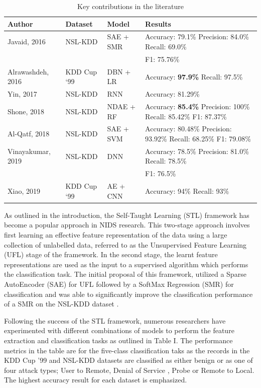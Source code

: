 \documentclass[conference]{IEEEtran}
\begin{document}
\begin{table}[htbp]
\caption{Key contributions in the literature}
\begin{center}
\begin{tabular}{|p{1.5cm}|p{1.8cm}|p{1.5cm}|p{2.1cm}|}
\hline
\textbf{Author} & \textbf{Dataset} & \textbf{Model} & \textbf{Results}\\[2pt]
\hline

Javaid, 2016 \cite{b2}  & NSL-KDD & SAE + SMR&
Accuracy: 79.1\% Precision: 84.0\% Recall: 69.0\%  \\
& & &F1: 75.76\%
\\[5pt]
\hline
Alrawashdeh, 2016 \cite{b6} & KDD Cup ‘99 & DBN + LR & Accuracy: \textbf{97.9\%} Recall: 97.5\%\\[10pt]
\hline
Yin, 2017 & NSL-KDD & RNN&
Accuracy: 81.29\% \\[5pt]
\hline
Shone, 2018 \cite{b10} & NSL-KDD & NDAE + RF & 
Accuracy: \textbf{85.4\%} Precision: 100\% Recall: 85.42\% F1: 87.37\%\\
\hline 
Al-Qatf, 2018 & NSL-KDD & SAE + SVM & 
Accuracy: 80.48\% Precision: 93.92\% Recall: 68.25\% F1: 79.08\%\\
\hline
Vinayakumar, 2019 & NSL-KDD & DNN &
Accuracy: 78.5\%  Precision: 81.0\% Recall: 78.5\% \\
& & & F1: 76.5\% \\ 
\hline 
Xiao, 2019 & KDD Cup ‘99 & AE + CNN & 
Accuracy: 94\% Recall: 93\% \\
\hline 
\end{tabular}
\label{tab1}
\end{center}
\end{table}

As outlined in the introduction, the Self-Taught Learning (STL) framework has become a popular approach in NIDS research. This two-stage approach involves first learning an effective feature representation of the data using a large collection of unlabelled data, referred to as the Unsupervised Feature Learning (UFL) stage of the framework. In the second stage, the learnt feature representations are used as the input to a supervised algorithm which performs the classification task. The initial proposal of this framework, utilized a Sparse AutoEncoder (SAE) for UFL followed by a SoftMax Regression (SMR) for classification and was able to significantly improve the classification performance of a SMR on the NSL-KDD dataset\cite{b2} . 

Following the success of the STL framework, numerous researchers have experimented with different combinations of models to perform the feature extraction and classification tasks as outlined in Table I. The performance metrics in the table are for the five-class classification taks as the records in the KDD Cup '99 and NSL-KDD datasets are classified as either benign or as one of four attack types; User to Remote, Denial of Service , Probe or Remote to Local. The highest accuracy result for each dataset is emphasized. 
\end{document}
